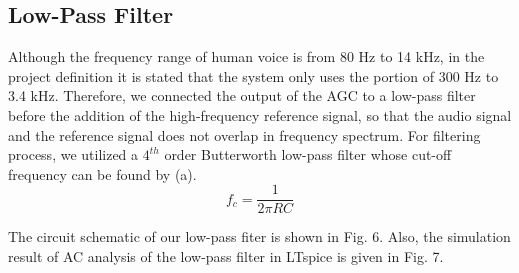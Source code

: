 \documentclass[conference]{IEEEtran}
\begin{document}
\subsection{Low-Pass Filter}
Although the frequency range of human voice is from 80 Hz to 14 kHz, in the project definition it is stated that the system only uses the portion of 300 Hz to 3.4 kHz. Therefore, we connected the output of the AGC to a low-pass filter before the addition of the high-frequency reference signal, so that the audio signal and the reference signal does not overlap in frequency spectrum. For filtering process, we utilized a \(4^{th}\) order Butterworth low-pass filter whose cut-off frequency can be found by (a). 
\begin{equation}\label{eq:a}
f_c = \frac{1}{2\pi RC}
\end{equation}  
\par The circuit schematic of our low-pass fiter is shown in Fig. 6.  Also, the simulation result of AC analysis of the low-pass filter in LTspice is given in Fig. 7.
\end{document}
